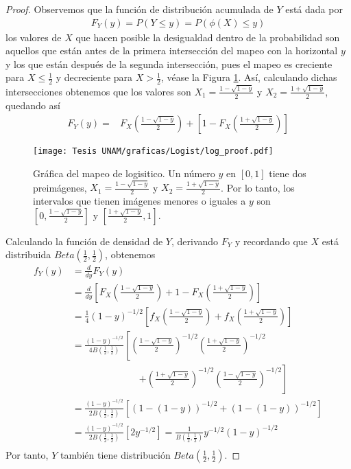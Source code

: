 \documentclass[../Main.tex]{subfiles}
\begin{document}
\begin{proof}
Observemos que la función de distribución acumulada de $Y$ está dada por \begin{align*}
    F_Y(y)=P(Y\leq y)=P(\phi(X)\leq y)
\end{align*}
los valores de $X$ que hacen posible la desigualdad dentro de la probabilidad son aquellos que están antes de la primera intersección del mapeo con la horizontal $y$ y los que están después de la segunda intersección, pues el mapeo es creciente para $X\leq \frac{1}{2}$ y decreciente para $X>\frac{1}{2}$, véase la Figura \ref{fig:log_proof}. Así, calculando dichas intersecciones obtenemos que los valores son $X_1=\frac{1-\sqrt{1-y}}{2}$ y $X_2=\frac{1+\sqrt{1-y}}{2}$, quedando así 
\begin{align*}
    F_Y(y)=&F_X\left(\frac{1-\sqrt{1-y}}{2}\right)+\left[1-F_X\left(\frac{1+\sqrt{1-y}}{2}\right)\right]
\end{align*}

\begin{figure}[h]
    \centering
    \texttt{[image: Tesis UNAM/graficas/Logist/log\_proof.pdf]}
    \caption{Gráfica del mapeo de logisitico. Un número $y$ en $[0,1]$ tiene dos preimágenes, $X_1=\frac{1-\sqrt{1-y}}{2}$ y $X_2=\frac{1+\sqrt{1-y}}{2}$. Por lo tanto, los intervalos que tienen imágenes menores o iguales a $y$ son $\left[0,\frac{1-\sqrt{1-y}}{2}\right]$ y $\left[\frac{1+\sqrt{1-y}}{2},1\right]$.}
    \label{fig:log_proof}
\end{figure} 


Calculando la función de densidad de $Y$, derivando $F_Y$ y recordando que $X$ está distribuida $Beta\left(\frac{1}{2},\frac{1}{2}\right)$, obtenemos
\begin{align*}
f_Y(y) &= \frac{d}{dy} F_Y(y) \\
       &= \frac{d}{dy} \left[ F_X\left( \frac{1 - \sqrt{1 - y}}{2} \right) + 1 - F_X\left( \frac{1 + \sqrt{1 - y}}{2} \right) \right] \\
       &= \frac{1}{4} (1 - y)^{-1/2} \left[ f_X\left( \frac{1 - \sqrt{1 - y}}{2} \right) + f_X\left( \frac{1 + \sqrt{1 - y}}{2} \right) \right] \\
       &= \frac{(1 - y)^{-1/2}}{4B\left( \frac{1}{2}, \frac{1}{2} \right)} \left[ \left( \frac{1 - \sqrt{1 - y}}{2} \right)^{-1/2}\left( \frac{1 + \sqrt{1 - y}}{2} \right)^{-1/2} \right. \\
       & \qquad\qquad\qquad\quad \left. + \left( \frac{1 + \sqrt{1 - y}}{2} \right)^{-1/2}\left( \frac{1 - \sqrt{1 - y}}{2} \right)^{-1/2} \right] \\
       &= \frac{(1 - y)^{-1/2}}{2B\left( \frac{1}{2}, \frac{1}{2} \right)} \left[ \left( 1 - (1 - y) \right)^{-1/2} + \left( 1 - (1 - y) \right)^{-1/2} \right] \\
       &= \frac{(1 - y)^{-1/2}}{2B\left( \frac{1}{2}, \frac{1}{2} \right)} \left[ 2y^{-1/2} \right]=  \frac{1}{B\left( \frac{1}{2}, \frac{1}{2} \right)}  y^{-1/2}(1 - y)^{-1/2} \\
\end{align*}
 Por tanto, $Y$ también tiene distribución $Beta\left(\frac{1}{2},\frac{1}{2}\right)$. 
\end{proof}
\end{document}
